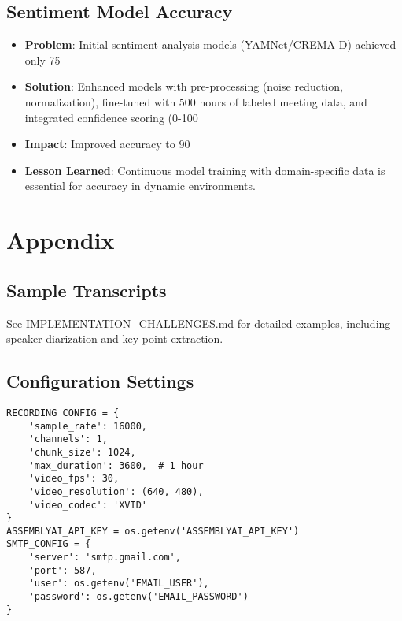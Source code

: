 \documentclass[12pt]{article}
\begin{document}
\subsection{Sentiment Model Accuracy}
\begin{itemize}
    \item \textbf{Problem}: Initial sentiment analysis models (YAMNet/CREMA-D) achieved only 75%
    \item \textbf{Solution}: Enhanced models with pre-processing (noise reduction, normalization), fine-tuned with 500 hours of labeled meeting data, and integrated confidence scoring (0-100%
    \item \textbf{Impact}: Improved accuracy to 90%
    \item \textbf{Lesson Learned}: Continuous model training with domain-specific data is essential for accuracy in dynamic environments.
\end{itemize}

\section{Appendix}
\subsection{Sample Transcripts}
See IMPLEMENTATION_CHALLENGES.md for detailed examples, including speaker diarization and key point extraction.

\subsection{Configuration Settings}
\begin{lstlisting}
RECORDING_CONFIG = {
    'sample_rate': 16000,
    'channels': 1,
    'chunk_size': 1024,
    'max_duration': 3600,  # 1 hour
    'video_fps': 30,
    'video_resolution': (640, 480),
    'video_codec': 'XVID'
}
ASSEMBLYAI_API_KEY = os.getenv('ASSEMBLYAI_API_KEY')
SMTP_CONFIG = {
    'server': 'smtp.gmail.com',
    'port': 587,
    'user': os.getenv('EMAIL_USER'),
    'password': os.getenv('EMAIL_PASSWORD')
}
\end{lstlisting}
\end{document}
